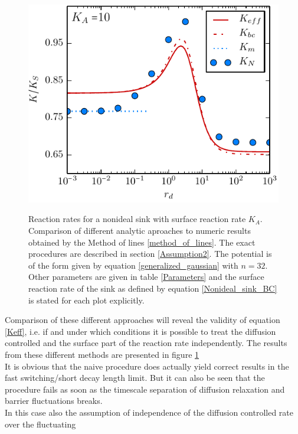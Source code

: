 \begin{minipage}[t]{.63 \textwidth}
\begin{figure}[H]
        \hspace{-1cm } \includegraphics[width = 1 \textwidth]{plots/rep_rate_comparison2.pdf}
    \end{figure}
\end{minipage}
\begin{minipage}[t]{.37 \textwidth}
    \begin{figure}[H]
        \caption{Reaction rates for a nonideal sink with surface reaction rate $K_A$. Comparison of different analytic aproaches to numeric results obtained by the Method of lines \ref{method_of_lines}. The exact procedures are described in section \ref{Assumption2}. The potential is of the form given by equation \eqref{generalized_gaussian} with $n = 32$. Other parameters are given in table \ref{Parameters} and the surface reaction rate of the sink as defined by equation \eqref{Nonideal_sink_BC} is stated for each plot explicitly.\label{Keff_comp}} 
    \end{figure}
Comparison of these different approaches will reveal the validity of equation \eqref{Keff}, i.e. if and under which conditions it is possible to treat the diffusion controlled and the surface part of the reaction rate independently. The results from these different methods are presented in figure \ref{Keff_comp} \\
It is obvious that the naive procedure does actually yield correct results in the fast switching/short decay length limit. But it can also be seen that the procedure fails as soon as the timescale separation of diffusion relaxation and barrier fluctuations breaks. \\
In this case also the assumption of independence of the diffusion controlled rate over the fluctuating
  \end{minipage}

